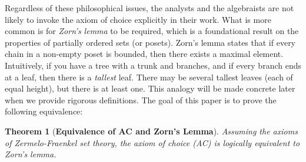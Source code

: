 \documentclass{article}
\newtheorem{theorem}{Theorem}[section]
\theoremstyle{definition}
\begin{document}
        Regardless of these philosophical issues, the analysts and the
        algebraists are not likely to invoke the axiom of choice explicitly
        in their work. What is more common is for \textit{Zorn's lemma} to
        be required, which is a foundational result on the properties of
        partially ordered sets (or posets). Zorn's lemma states that if every
        chain in a non-empty poset is bounded,
        then there exists a maximal element.
        Intuitively, if you have a tree with a trunk and branches, and if
        every branch ends at a leaf, then there is a \textit{tallest} leaf.
        There may be several tallest leaves (each of equal height), but there
        is at least one. This analogy will be made concrete later when we
        provide rigorous definitions. The goal of this paper is to prove the
        following equivalence:
        \begin{theorem}[\textbf{Equivalence of AC and Zorn's Lemma}]
            Assuming the axioms of Zermelo-Fraenkel set theory,
            the axiom of choice (AC) is logically equivalent to Zorn's lemma.
        \end{theorem}
\end{document}
